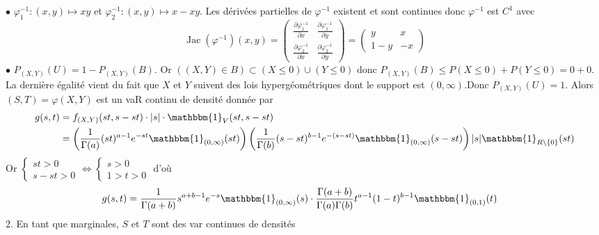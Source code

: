 \documentclass{report}
\begin{document}
$\bullet$ $\varphi^{-1}_1\colon (x,y) \mapsto xy$ et $\varphi^{-1}_2\colon (x,y) \mapsto x-xy$. Les dérivées partielles de $\varphi^{-1}$ existent et sont continues donc $\varphi^{-1}$ est $C^1$ avec $$ \operatorname{Jac}(\varphi^{-1})(x,y)  =\begin{pmatrix} 
\frac{\partial \varphi^{-1}_1}{\partial x} & \frac{\partial \varphi^{-1}_1}{\partial y} \\
\frac{\partial \varphi^{-1}_2}{\partial x} & \frac{\partial \varphi^{-1}_2}{\partial y}
\end{pmatrix} = \begin{pmatrix}
y & x \\
1-y & -x
\end{pmatrix}$$\newline
$\bullet$ $P_{(X,Y)}(U) = 1-P_{(X,Y)}(B)$. Or $((X,Y)\in B) \subset (X\leq 0) \cup (Y\leq 0)$ donc \newline$P_{(X,Y)}(B) \leq P(X\leq 0) + P(Y\leq 0) = 0+0$. La dernière égalité vient du fait que $X$ et $Y$ suivent des lois hypergéométriques dont le support est $(0,\infty)$.\newline Donc $P_{(X,Y)}(U) = 1$.\newline
Alors $(S,T)=\varphi(X,Y)$ est un vaR continu de densité donnée par $$\begin{aligned}
g(s,t)&=f_{(X,Y)}(st,s-st)\cdot |s| \cdot \mathbbm{1}_V(st,s-st)\\
&= \left(\frac{1}{\Gamma(a)}(st)^{a-1}e^{-st}\mathbbm{1}_{(0,\infty)}(st)\right) \left(\frac{1}{\Gamma(b)}(s-st)^{b-1}e^{-(s-st)}\mathbbm{1}_{(0,\infty)}(s-st)\right) |s| \mathbbm{1}_{R\setminus \{0\}}(st)
\end{aligned}$$
Or $\begin{cases}
st>0 \\
s-st>0
\end{cases} \iff \begin{cases}
s>0 \\
1>t> 0
\end{cases}$ d'où $$\begin{aligned}
g(s,t)&= \frac{1}{\Gamma(a+b)}s^{a+b-1}e^{-s}\mathbbm{1}_{(0,\infty)}(s) \cdot \frac{\Gamma(a+b)}{\Gamma(a)\Gamma(b)} t^{a-1} (1-t)^{b-1}\mathbbm{1}_{(0,1)}(t)
\end{aligned}$$
2. En tant que marginales, $S$ et $T$ sont des var continues de densités 
\end{document}
